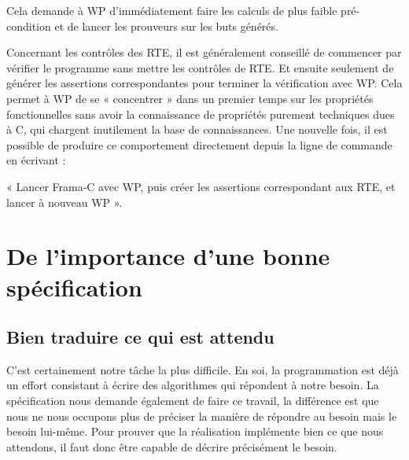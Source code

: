 \documentclass[12pt,francais,]{scrbook}
\newenvironment{Shaded}{}{}
\newcommand{\KeywordTok}[1]{\textcolor[rgb]{0.00,0.44,0.13}{\textbf{{#1}}}}
\newcommand{\NormalTok}[1]{{#1}}
\begin{document}
\begin{footnotesize}\begin{Shaded}
\end{Shaded}\end{footnotesize}

Cela demande à WP d'immédiatement faire les calculs de plus faible
pré-condition et de lancer les prouveurs sur les buts générés.

Concernant les contrôles des RTE, il est généralement conseillé de
commencer par vérifier le programme sans mettre les contrôles de RTE. Et
ensuite seulement de générer les assertions correspondantes pour
terminer la vérification avec WP. Cela permet à WP de se « concentrer »
dans un premier temps sur les propriétés fonctionnelles sans avoir la
connaissance de propriétés purement techniques dues à C, qui chargent
inutilement la base de connaissances. Une nouvelle fois, il est possible
de produire ce comportement directement depuis la ligne de commande en
écrivant :

\begin{footnotesize}\begin{Shaded}
\end{Shaded}\end{footnotesize}

« Lancer Frama-C avec WP, puis créer les assertions correspondant aux
RTE, et lancer à nouveau WP ».

\section{De l'importance d'une bonne
spécification}\label{de-limportance-dune-bonne-spuxe9cification}

\subsection{Bien traduire ce qui est
attendu}\label{bien-traduire-ce-qui-est-attendu}

C'est certainement notre tâche la plus difficile. En soi, la
programmation est déjà un effort consistant à écrire des algorithmes qui
répondent à notre besoin. La spécification nous demande également de
faire ce travail, la différence est que nous ne nous occupons plus de
préciser la manière de répondre au besoin mais le besoin lui-même. Pour
prouver que la réalisation implémente bien ce que nous attendons, il
faut donc être capable de décrire précisément le besoin.
\end{document}
